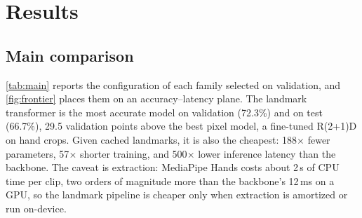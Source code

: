 \documentclass{article}
\begin{document}
\section{Results}
\subsection{Main comparison}
\cref{tab:main} reports the configuration of each family selected on validation, and
\cref{fig:frontier} places them on an accuracy--latency plane. The landmark transformer is the most
accurate model on validation (72.3\%) and on test (66.7\%), 29.5 validation points above the best pixel
model, a fine-tuned R(2+1)D on hand crops. Given cached landmarks, it is also the cheapest: 188$\times$ fewer
parameters, 57$\times$ shorter training, and 500$\times$ lower inference latency than the backbone. The
caveat is extraction: MediaPipe Hands costs about 2\,s of CPU time per clip, two orders of magnitude more
than the backbone's 12\,ms on a GPU, so the landmark pipeline is cheaper only when extraction is amortized
or run on-device.
\end{document}
